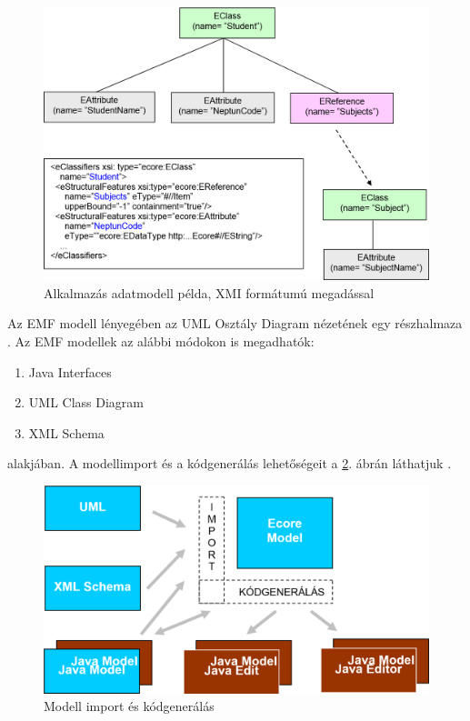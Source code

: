 \begin{figure}[h]
\centering
\includegraphics[width=\textwidth]{figures/datamodel-example-with-xmi-desc.png}
\caption{Alkalmazás adatmodell példa, XMI formátumú megadással}
\label{fig:DataModelWithXMI}
\end{figure}

Az EMF modell lényegében az UML Osztály Diagram nézetének egy részhalmaza \cite{EMFFundamentals}.
Az EMF modellek az alábbi módokon is megadhatók:
\begin{enumerate}
	\item Java Interfaces
	\item UML Class Diagram
	\item XML Schema
\end{enumerate}
alakjában. A modellimport és a kódgenerálás lehetőségeit a \ref{fig:ModelImportAndCodegen}. ábrán láthatjuk \cite{EMFFundamentals}.

\begin{figure}[h]
\centering
\includegraphics[width=\textwidth]{figures/model-import-and-codegen.png}
\caption{Modell import és kódgenerálás}
\label{fig:ModelImportAndCodegen}
\end{figure}

